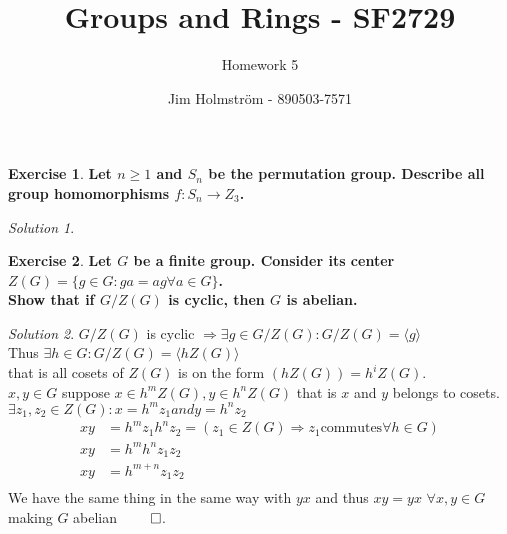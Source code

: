 \documentclass[a4paper,twoside=false,abstract=false,numbers=noenddot,
titlepage=false,headings=small,parskip=half,version=last]{scrartcl}
\author{Jim Holmström - 890503-7571}
\title{Groups and Rings - SF2729}
\subtitle{Homework 5}
\theoremstyle{definition}
\newtheorem{exercise}{Exercise}
\theoremstyle{remark}
\newtheorem*{solution}{Solution}
\begin{document}
\maketitle
\thispagestyle{empty}

\begin{exercise}
{\bf
Let $n \ge 1$ and $S_n$ be the permutation group. Describe all group homomorphisms $f : S_n \rightarrow Z_3$.
}
\end{exercise}
\begin{solution}

\end{solution}

\begin{exercise}
{\bf
Let $G$ be a  finite group. Consider its center $Z(G) = \{ g \in G : ga=ag \forall a\in G\}$.\\
Show that if $G/Z(G)$ is cyclic, then $G$ is abelian.
}
\end{exercise}
\begin{solution}
$G/Z(G)$ is cyclic $\Rightarrow \exists g \in G/Z(G) : G/Z(G) = \langle g
\rangle$\\
Thus $\exists h \in G : G/Z(G) = \langle hZ(G) \rangle$\\
that is all cosets of $Z(G)$ is on the form $(hZ(G))=h^iZ(G)$. \\
$x,y \in G$ suppose $x \in h^mZ(G),y \in h^nZ(G)$ that is $x$ and $y$ belongs
to cosets. $\exists z_1,z_2 \in Z(G) : x=h^mz_1 and y=h^nz_2 $\\
\begin{align*}
    xy &= h^mz_1h^nz_2 = (z_1\in Z(G) \Rightarrow z_1 \mbox{commutes} \forall h
    \in G)\\
    xy &= h^mh^nz_1z_2 \\
    xy &= h^{m+n}z_1z_2 \\
\end{align*}
We have the same thing in the same way with $yx$ and thus $xy=yx$ $\forall x,y
\in G$ making $G$ abelian $\qed$.

\end{solution}


\end{document}
